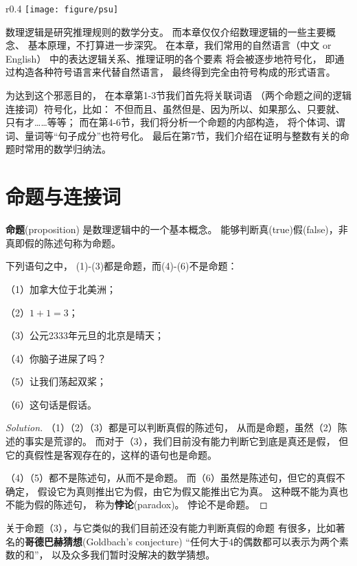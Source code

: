 
\begin{wrapfigure}{r}{0.4\textwidth}
\centering
\texttt{[image: figure/psu]}
\end{wrapfigure}数理逻辑是研究推理规则的数学分支。
而本章仅仅介绍数理逻辑的一些主要概念、
基本原理，不打算进一步深究。
在本章，我们常用的自然语言（中文 or English）
中的表达逻辑关系、推理证明的各个要素
将会被逐步地符号化，
即通过构造各种符号语言来代替自然语言，
最终得到完全由符号构成的形式语言。

为达到这个邪恶目的，
在本章第1-3节我们首先将关联词语
（两个命题之间的逻辑连接词）符号化，比如：
不但而且、虽然但是、因为所以、如果那么、只要就、只有才……等等；
而在第4-6节，我们将分析一个命题的内部构造，
将个体词、谓词、量词等“句子成分”也符号化。
最后在第7节，我们介绍在证明与整数有关的命题时常用的数学归纳法。


\section{命题与连接词}

\textbf{命题}(proposition)
是数理逻辑中的一个基本概念。
能够判断真(true)假(false)，非真即假的陈述句称为命题。

\begin{example}下列语句之中，
(1)-(3)都是命题，而(4)-(6)不是命题：

（1）加拿大位于北美洲；

（2）$1+1=3$；

（3）公元2333年元旦的北京是晴天；

（4）你脑子进屎了吗？

（5）让我们荡起双桨；

（6）这句话是假话。\label{examples of propositions}
\end{example}

\begin{proof}[Solution]
（1）（2）（3）都是可以判断真假的陈述句，
从而是命题，虽然（2）陈述的事实是荒谬的。
而对于（3），我们目前没有能力判断它到底是真还是假，
但它的真假性是客观存在的，这样的语句也是命题。

（4）（5）都不是陈述句，从而不是命题。
而（6）虽然是陈述句，但它的真假不确定，
假设它为真则推出它为假，由它为假又能推出它为真。
这种既不能为真也不能为假的陈述句，
称为\textbf{悖论}(paradox)。
悖论不是命题。
\end{proof}

关于命题（3），与它类似的我们目前还没有能力判断真假的命题
有很多，比如著名的\textbf{哥德巴赫猜想}(Goldbach's conjecture)
“任何大于$4$的偶数都可以表示为两个素数的和”，
以及众多我们暂时没解决的数学猜想。\vsp

